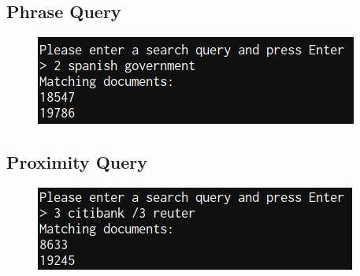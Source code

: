 \documentclass{article}
\begin{document}
\subsection{Phrase Query}

\begin{figure}[ht]
	\centering
	\includegraphics{phrase.png}
\end{figure}

\subsection{Proximity Query}

\begin{figure}[ht]
	\centering
	\includegraphics{proximity.png}
\end{figure}
\end{document}
